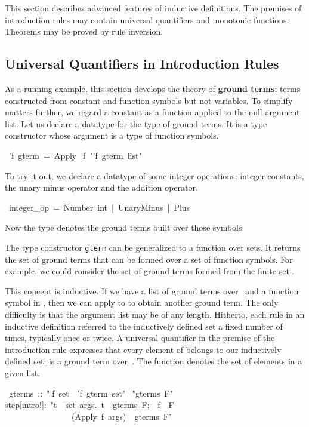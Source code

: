 This section describes advanced features of inductive definitions. 
The premises of introduction rules may contain universal quantifiers and
monotonic functions.  Theorems may be proved by rule inversion.

\subsection{Universal Quantifiers in Introduction Rules}
\label{sec:gterm-datatype}

As a running example, this section develops the theory of \textbf{ground
terms}: terms constructed from constant and function 
symbols but not variables. To simplify matters further, we regard a
constant as a function applied to the null argument  list.  Let us declare a
datatype  for the type of ground  terms. It is a type constructor
whose argument is a type of  function symbols. 
\begin{isabelle}
\ 'f\ gterm\ =\ Apply\ 'f\ "'f\ gterm\ list"
\end{isabelle}
To try it out, we declare a datatype of some integer operations: 
integer constants, the unary minus operator and the addition 
operator. 
\begin{isabelle}
\ integer_op\ =\ Number\ int\ |\ UnaryMinus\ |\ Plus
\end{isabelle}
Now the type  denotes the ground 
terms built over those symbols.

The type constructor \texttt{gterm} can be generalized to a function 
over sets.  It returns 
the set of ground terms that can be formed over a set  of function symbols. For
example,  we could consider the set of ground terms formed from the finite 
set {}.

This concept is inductive. If we have a list  of ground terms 
over~ and a function symbol  in , then we 
can apply  to   to obtain another ground term. 
The only difficulty is that the argument list may be of any length. Hitherto, 
each rule in an inductive definition referred to the inductively 
defined set a fixed number of times, typically once or twice. 
A universal quantifier in the premise of the introduction rule 
expresses that every element of  belongs
to our inductively defined set: is a ground term 
over~.  The function {} denotes the set of elements in a given 
list. 
\begin{isabelle}
\ gterms\ ::\ "'f\ set\ \isasymRightarrow \ 'f\ gterm\ set"\isanewline
{}\ "gterms\ F"\isanewline
{}\isanewline
step[intro!]:\ "\isasymlbrakk \isasymforall t\ \isasymin \ set\ args.\ t\ \isasymin \ gterms\ F;\ \ f\ \isasymin \ F\isasymrbrakk \isanewline
\ \ \ \ \ \ \ \ \ \ \ \ \ \ \ \isasymLongrightarrow \ (Apply\ f\ args)\ \isasymin \ gterms\
F"
\end{isabelle}


